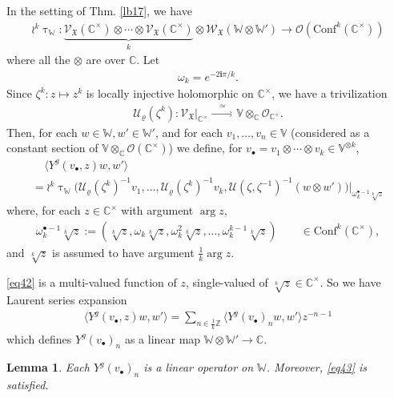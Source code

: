 \documentclass[12pt,a4paper,notitlepage]{article}
\theoremstyle{definition}
\theoremstyle{plain}
\newtheorem{lm}[df]{Lemma}
\newcommand{\fk}{\mathfrak}
\newcommand{\mc}{\mathcal}
\newcommand{\Conf}{\mathrm{Conf}}
\newcommand{\bk}[1]{\langle {#1}\rangle}
\newcommand{\scr}{\mathscr}
\newcommand{\im}{\mathbf{i}}
\newcommand{\blt}{\bullet}
\newcommand{\Vbb}{\mathbb V}
\newcommand{\Wbb}{\mathbb W}
\newcommand{\Cbb}{\mathbb C}
\newcommand{\Zbb}{\mathbb Z}
\numberwithin{equation}{section}
\begin{document}
In the setting of Thm. \ref{lb17}, we have
\begin{gather*}
\wr^k\uptau_\Wbb:\underbrace{\scr V_{\fk X}(\Cbb^\times)\otimes\cdots \otimes\scr V_{\fk X}(\Cbb^\times)}_k\otimes\scr W_{\fk X}(\Wbb\otimes\Wbb')\rightarrow\scr O(\Conf^k(\Cbb^\times))
\end{gather*}
where all the $\otimes$ are over $\Cbb$. Let  \index{zz@$\omega_k=e^{-2\im\pi/k}$}
\begin{align*}
\omega_k=e^{-2\im\pi/k}.	
\end{align*}
Since $\zeta^k:z\mapsto z^k$ is locally injective holomorphic on $\Cbb^\times$, we have a trivilization
\begin{align*}
\mc U_\varrho(\zeta^k):	\scr V_{\fk X}|_{\Cbb^\times}\xrightarrow{\quad\simeq\quad}\Vbb\otimes_\Cbb\scr O_{\Cbb^\times}.
\end{align*}
Then, for each $w\in\Wbb,w'\in\Wbb'$, and for each $v_1,\dots,v_n\in\Vbb$ (considered as a constant section of $\Vbb\otimes_\Cbb\scr O(\Cbb^\times)$) we define, for $v_\blt=v_1\otimes\cdots\otimes v_k\in\Vbb^{\otimes k}$,
\begin{equation}
\boxed{
\begin{array}{l}
~~~~~\bk{Y^g(v_\blt,z)w,w'}\\[0.8ex]
=\wr^k\uptau_\Wbb\big(\mc U_\varrho(\zeta^k)^{-1}v_1,\dots,\mc U_\varrho(\zeta^k)^{-1}v_k,\mc U(\zeta,\zeta^{-1})^{-1}(w\otimes w')\big)\Big|_{\omega_k^{\blt-1}\sqrt[k]{z}}	
\end{array}		\label{eq42}
}
\end{equation}
where, for each $z\in\Cbb^\times$ with argument $\arg z$, \index{zz@$\omega_k^{\blt-1}\sqrt[k]{z}$}
\begin{align}
\omega_k^{\blt-1}\sqrt[k]{z}:=(\sqrt[k]{z},\omega_k\sqrt[k]{z},\omega_k^2\sqrt[k]{z},\dots,\omega_k^{k-1}\sqrt[k]{z})	\qquad \in\Conf^k(\Cbb^\times),\label{eq48}
\end{align}
and $\sqrt[k]z$ is assumed to have argument $\frac 1k\arg z$.

\eqref{eq42} is a multi-valued function of $z$, single-valued of $\sqrt[k]{z}\in\Cbb^\times$. So we have Laurent series expansion
\begin{align*}
\bk{Y^g(v_\blt,z)w,w'}=\sum_{n\in\frac 1k\Zbb}\bk{Y^g(v_\blt)_nw,w'}	z^{-n-1}
\end{align*}
which defines $Y^g(v_\blt)_n$ as a linear map $\Wbb\otimes\Wbb'\rightarrow\Cbb$.

\begin{lm}
Each $Y^g(v_\blt)_n$ is a linear operator on $\Wbb$. Moreover, \eqref{eq43} is satisfied.
\end{lm}
\end{document}

